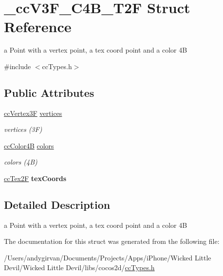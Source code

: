 \hypertarget{struct__cc_v3_f___c4_b___t2_f}{\section{\-\_\-cc\-V3\-F\-\_\-\-C4\-B\-\_\-\-T2\-F Struct Reference}
\label{struct__cc_v3_f___c4_b___t2_f}
}


a Point with a vertex point, a tex coord point and a color 4\-B  




{\ttfamily \#include $<$cc\-Types.\-h$>$}

\subsection*{Public Attributes}
\begin{DoxyCompactItemize}
\item 
\hypertarget{struct__cc_v3_f___c4_b___t2_f_a638506dcd0346e63dd1c0ad4765ac8bc}{\hyperlink{cc_types_8h_a351ac51e9885af9a15676faf8cb49f8a}{cc\-Vertex3\-F} \hyperlink{struct__cc_v3_f___c4_b___t2_f_a638506dcd0346e63dd1c0ad4765ac8bc}{vertices}}\label{struct__cc_v3_f___c4_b___t2_f_a638506dcd0346e63dd1c0ad4765ac8bc}

\begin{DoxyCompactList}\small\item\em vertices (3\-F) \end{DoxyCompactList}\item 
\hypertarget{struct__cc_v3_f___c4_b___t2_f_a8a1d6c1385721a1f3e633f339ec9fdce}{\hyperlink{cc_types_8h_a2f83e39e0378b79d089014c140169793}{cc\-Color4\-B} \hyperlink{struct__cc_v3_f___c4_b___t2_f_a8a1d6c1385721a1f3e633f339ec9fdce}{colors}}\label{struct__cc_v3_f___c4_b___t2_f_a8a1d6c1385721a1f3e633f339ec9fdce}

\begin{DoxyCompactList}\small\item\em colors (4\-B) \end{DoxyCompactList}\item 
\hypertarget{struct__cc_v3_f___c4_b___t2_f_a393c7dfa5f174113895eb7c7323d834f}{\hyperlink{cc_types_8h_a95226f1345c203215cc1f419aafe47c5}{cc\-Tex2\-F} {\bfseries tex\-Coords}}\label{struct__cc_v3_f___c4_b___t2_f_a393c7dfa5f174113895eb7c7323d834f}

\end{DoxyCompactItemize}


\subsection{Detailed Description}
a Point with a vertex point, a tex coord point and a color 4\-B 

The documentation for this struct was generated from the following file\-:\begin{DoxyCompactItemize}
\item 
/\-Users/andygirvan/\-Documents/\-Projects/\-Apps/i\-Phone/\-Wicked Little Devil/\-Wicked Little Devil/libs/cocos2d/\hyperlink{cc_types_8h}{cc\-Types.\-h}\end{DoxyCompactItemize}
